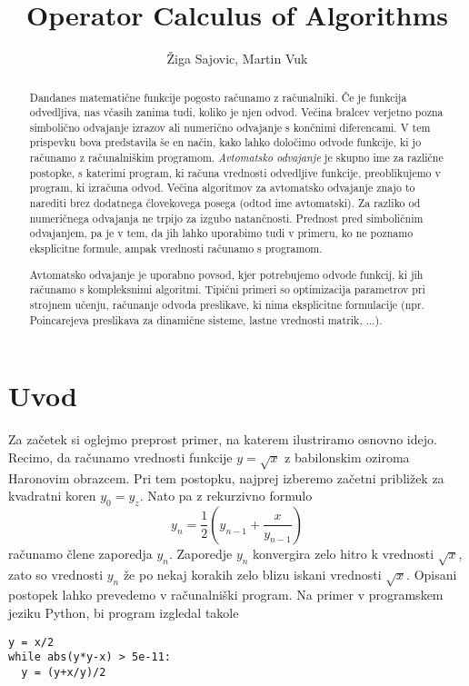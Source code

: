 \documentclass{article}
\title{Operator Calculus of Algorithms}
\author{Žiga Sajovic, Martin Vuk}
\begin{document}
\maketitle
\begin{abstract}
  Dandanes matematične funkcije pogosto računamo z računalniki. Če je funkcija
  odvedljiva, nas včasih zanima tudi, koliko je njen odvod. Večina bralcev verjetno
  pozna simbolično odvajanje izrazov ali numerično odvajanje s končnimi
  diferencami. V tem prispevku bova predstavila še en način, kako lahko določimo
  odvode funkcije, ki jo računamo z računalniškim programom. \emph{Avtomatsko
    odvajanje} je skupno ime za različne postopke, s katerimi program, ki računa
  vrednosti odvedljive funkcije, preoblikujemo v program, ki izračuna odvod. 
  Večina algoritmov za avtomatsko odvajanje znajo to narediti brez dodatnega
  človekovega posega (odtod ime avtomatski). Za razliko
  od numeričnega odvajanja ne trpijo za izgubo natančnosti. Prednost pred
  simboličnim odvajanjem, pa je v tem, da jih lahko uporabimo tudi v primeru, ko
  ne poznamo eksplicitne formule, ampak vrednosti računamo s programom.

  Avtomatsko odvajanje je uporabno povsod, kjer potrebujemo 
  odvode funkcij, ki jih računamo s kompleksnimi algoritmi. Tipični primeri so
  optimizacija parametrov pri strojnem učenju, računanje odvoda preslikave, ki nima
  eksplicitne formulacije (npr. Poincarejeva preslikava za dinamične sisteme,
  lastne vrednosti matrik, ...).
\end{abstract}
\section{Uvod}
Za začetek si oglejmo preprost primer, na katerem ilustriramo osnovno idejo.
Recimo, da računamo vrednosti funkcije $y=\sqrt{x}$ z babilonskim oziroma Haronovim obrazcem.
Pri tem postopku, najprej izberemo začetni približek za
kvadratni koren $y_0=y_z$. Nato pa z rekurzivno formulo
\begin{equation*}
  y_n=\frac{1}{2}\left( y_{n-1}+\frac{x}{y_{n-1}} \right)
\end{equation*}
računamo člene zaporedja $y_n$. Zaporedje $y_n$ konvergira zelo hitro k
vrednosti $\sqrt{x}$, zato so vrednosti $y_n$ že po nekaj korakih zelo blizu
iskani vrednosti $\sqrt{x}$. Opisani postopek lahko prevedemo v računalniški
program. Na primer v programskem jeziku Python, bi program izgledal takole 

\begin{verbatim}
y = x/2
while abs(y*y-x) > 5e-11:
  y = (y+x/y)/2
\end{verbatim}
\end{document}
